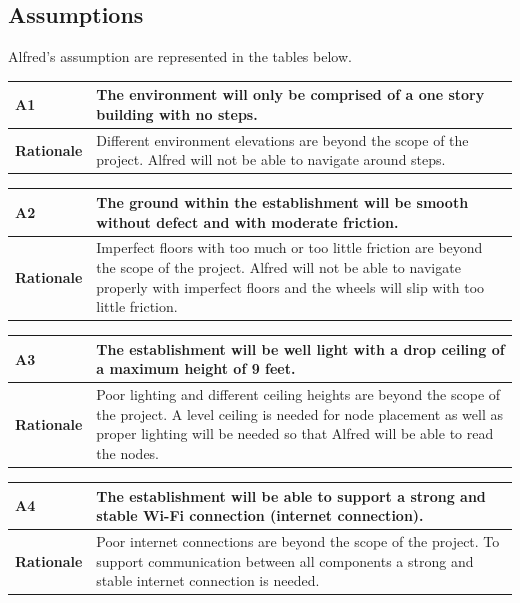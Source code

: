 \documentclass [10pt]{article}
\begin{document}
\subsection{Assumptions}

Alfred's assumption are represented in the tables below.  \\

\begin{longtable}{| p{ } | p{ } | }\hline 
\rowcolor{tableCell}\textbf{A1} & The environment will only be comprised of a one story building with no steps. \\ \hline
\textbf{Rationale} & Different environment elevations are beyond the scope of the project. Alfred will not be able to navigate around steps.\\ \hline 
\end{longtable}

\begin{longtable}{| p{ } | p{ } | }\hline 
\rowcolor{tableCell}\textbf{A2} & The ground within the establishment will be smooth without defect and with moderate friction. \\ \hline
\textbf{Rationale} & Imperfect floors with too much or too little friction are beyond the scope of the project. Alfred will not be able to navigate properly with imperfect floors and the wheels will slip with too little friction. \\ \hline 
\end{longtable}

\begin{longtable}{| p{ } | p{ } | }\hline 
\rowcolor{tableCell}\textbf{A3} & The establishment will be well light with a drop ceiling of a maximum height of 9 feet.  \\ \hline
\textbf{Rationale} & Poor lighting and different ceiling heights are beyond the scope of the project. A level ceiling is needed for node placement as  well as proper lighting will be needed so that Alfred will be able to read the nodes. \\ \hline 
\end{longtable}

\begin{longtable}{| p{ } | p{ } | }\hline 
\rowcolor{tableCell}\textbf{A4} & The establishment will be able to support a strong and stable Wi-Fi connection (internet connection).  \\ \hline
\textbf{Rationale} & Poor internet connections are beyond the scope of the project. To support communication between all components a strong and stable internet connection is needed.\\ \hline 
\end{longtable}
\end{document}
